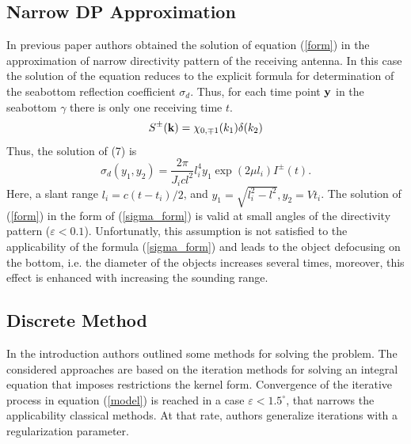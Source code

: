 \documentclass{procDDs}
\begin{document}
\subsection{Narrow DP Approximation}
In previous paper\cite{SPIE_KOV} authors obtained the solution of equation (\ref{form}) in the approximation of narrow directivity pattern of the receiving antenna. In this case the solution of the equation reduces to the explicit formula for determination of the  seabottom reflection coefficient $\sigma_d$. Thus, for each time point $\mathbf{y}$ in the seabottom $\gamma$ there is only one receiving time $t$.
\begin{equation}
S^{\pm}(\mathbf{k}) = \chi_{0,\mp1}(k_1)\delta(k_2)
\end{equation}
Thus, the solution of (7) is
\begin{equation}
	\label{sigma_form}
	\sigma_d \left( y_1, y_2 \right) = \frac{2\pi}{J_icl^2} l_i^4 y_1 \exp(2\mu l_i)I^\pm(t).
\end{equation}
Here, a slant range $l_i=c(t-t_i)/2$, and $y_1=\sqrt{l_i^2-l^2}, y_2=Vt_i$.
The solution of (\ref{form}) in the form of (\ref{sigma_form}) is valid at small angles of the directivity pattern ($\varepsilon<0.1$). Unfortunatly, this assumption is not satisfied to the applicability of the formula (\ref{sigma_form}) and leads to the object defocusing on the bottom, i.e. the diameter of the objects increases several times, moreover, this effect is enhanced with increasing the sounding range.

\subsection{Discrete Method}
In the introduction authors outlined some methods for solving the problem.  The considered approaches are based on the iteration methods for solving an integral equation that imposes restrictions the kernel form. Convergence of the iterative process in equation (\ref{model}) is reached in a case $\varepsilon < 1.5^\circ$, that narrows the applicability classical methods. At that rate, authors generalize iterations with a regularization parameter.
\end{document}
